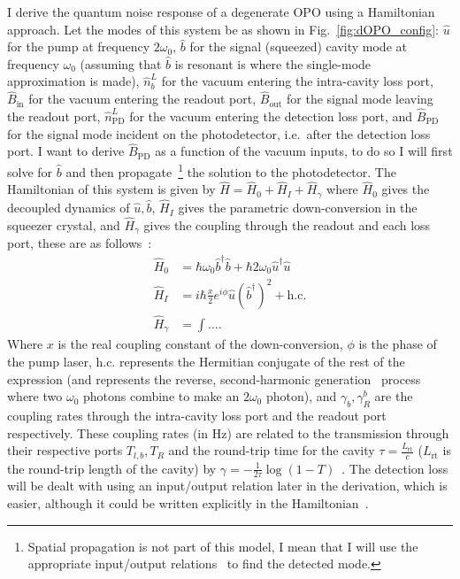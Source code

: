 I derive the quantum noise response of a degenerate OPO using a Hamiltonian approach. Let the modes of this system be as shown in Fig.~\ref{fig:dOPO_config}: $\hat u$ for the pump at frequency $2\omega_0$, $\hat b$ for the signal (squeezed) cavity mode at frequency $\omega_0$ (assuming that $\hat b$ is resonant is where the single-mode approximation is made), $\hat n^L_b$ for the vacuum entering the intra-cavity loss port, $\hat B_\text{in}$ for the vacuum entering the readout port, $\hat B_\text{out}$ for the signal mode leaving the readout port, $\hat n^L_\text{PD}$ for the vacuum entering the detection loss port, and $\hat B_\text{PD}$ for the signal mode incident on the photodetector, i.e.\ after the detection loss port. I want to derive $\hat B_\text{PD}$ as a function of the vacuum inputs, to do so I will first solve for $\hat b$ and then propagate~\footnote{Spatial propagation is not part of this model, I mean that I will use the appropriate input/output relations~\cite{} to find the detected mode.} the solution to the photodetector. The Hamiltonian of this system is given by $\hat H = \hat H_0 + \hat H_I + \hat H_\gamma$ where $\hat H_0$ gives the decoupled dynamics of $\hat u, \hat b$, $\hat H_I$ gives the parametric down-conversion in the squeezer crystal, and $\hat H_\gamma$ gives the coupling through the readout and each loss port, these are as follows~\cite{}: 
\begin{align}
\hat H_0 &= \hbar \omega_0 \hat b^\dag \hat b + \hbar 2 \omega_0 \hat u^\dag \hat u\\
\hat H_I &= i \hbar \frac{x}{2} e^{i\phi} \hat u (\hat b^\dag)^2 + \text{h.c.}\\
\hat H_\gamma &= \int \ldots .
\end{align}
Where $x$ is the real coupling constant of the down-conversion, $\phi$ is the phase of the pump laser, $\text{h.c.}$ represents the Hermitian conjugate of the rest of the expression (and represents the reverse, second-harmonic generation~\cite{} process where two $\omega_0$ photons combine to make an $2\omega_0$ photon), and $\gamma_b, \gamma^b_R$ are the coupling rates through the intra-cavity loss port and the readout port respectively. These coupling rates (in Hz) are related to the transmission through their respective ports $T_{l,b}, T_R$ and the round-trip time for the cavity $\tau = \frac{L_\text{rt}}{c}$ ($L_\text{rt}$ is the round-trip length of the cavity) by $\gamma = -\frac{1}{2\tau}\log(1-T)$~\cite{}. The detection loss will be dealt with using an input/output relation later in the derivation, which is easier, although it could be written explicitly in the Hamiltonian~\cite{}. 


